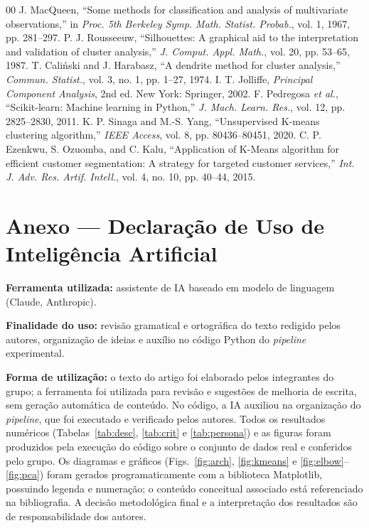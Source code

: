 \documentclass[conference]{IEEEtran}
\begin{document}
\begin{thebibliography}{00}
 J. MacQueen, ``Some methods for classification and analysis of multivariate observations,'' in \textit{Proc. 5th Berkeley Symp. Math. Statist. Probab.}, vol. 1, 1967, pp. 281--297.
 P. J. Rousseeuw, ``Silhouettes: A graphical aid to the interpretation and validation of cluster analysis,'' \textit{J. Comput. Appl. Math.}, vol. 20, pp. 53--65, 1987.
 T. Cali\'nski and J. Harabasz, ``A dendrite method for cluster analysis,'' \textit{Commun. Statist.}, vol. 3, no. 1, pp. 1--27, 1974.
 I. T. Jolliffe, \textit{Principal Component Analysis}, 2nd ed. New York: Springer, 2002.
 F. Pedregosa \textit{et al.}, ``Scikit-learn: Machine learning in Python,'' \textit{J. Mach. Learn. Res.}, vol. 12, pp. 2825--2830, 2011.
 K. P. Sinaga and M.-S. Yang, ``Unsupervised K-means clustering algorithm,'' \textit{IEEE Access}, vol. 8, pp. 80436--80451, 2020.
 C. P. Ezenkwu, S. Ozuomba, and C. Kalu, ``Application of K-Means algorithm for efficient customer segmentation: A strategy for targeted customer services,'' \textit{Int. J. Adv. Res. Artif. Intell.}, vol. 4, no. 10, pp. 40--44, 2015.
\end{thebibliography}



\section*{Anexo --- Declara\c{c}\~ao de Uso de Intelig\^encia Artificial}
\textbf{Ferramenta utilizada:} assistente de IA baseado em modelo de linguagem (Claude, Anthropic).

\textbf{Finalidade do uso:} revis\~ao gramatical e ortogr\'afica do texto redigido pelos autores, organiza\c{c}\~ao de ideias e aux\'ilio no c\'odigo Python do \textit{pipeline} experimental.

\textbf{Forma de utiliza\c{c}\~ao:} o texto do artigo foi elaborado pelos integrantes do grupo; a ferramenta foi utilizada para revis\~ao e sugest\~oes de melhoria de escrita, sem gera\c{c}\~ao autom\'atica de conte\'udo. No c\'odigo, a IA auxiliou na organiza\c{c}\~ao do \textit{pipeline}, que foi executado e verificado pelos autores. Todos os resultados num\'ericos (Tabelas~\ref{tab:desc}, \ref{tab:crit} e \ref{tab:persona}) e as figuras foram produzidos pela execu\c{c}\~ao do c\'odigo sobre o conjunto de dados real e conferidos pelo grupo. Os diagramas e gr\'aficos (Figs.~\ref{fig:arch}, \ref{fig:kmeans} e \ref{fig:elbow}--\ref{fig:pca}) foram gerados programaticamente com a biblioteca Matplotlib, possuindo legenda e numera\c{c}\~ao; o conte\'udo conceitual associado est\'a referenciado na bibliografia. A decis\~ao metodol\'ogica final e a interpreta\c{c}\~ao dos resultados s\~ao de responsabilidade dos autores.
\end{document}
